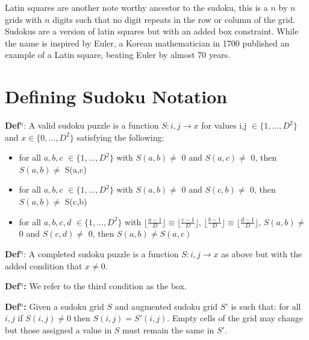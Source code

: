 \documentclass[a4paper,11pt]{report}
\newcounter{row}
\newcounter{col}
\begin{document}
Latin squares are another note worthy ancestor to the sudoku, this is a $n$ by $n$ grids with $n$ digits such that no digit repeats in the row or column of the grid. Sudokus are a version of latin squares but with an added box constraint. While the name is inspired by Euler, a  Korean mathematician in 1700 published an example of a Latin square, beating Euler by almost 70 years. 
	
\section{Defining Sudoku Notation}
	
\textbf{Def$^n$}: A valid sudoku puzzle is a function $ S: i,j \rightarrow x$ for values i,j $\in \{1,...,D^2\}$ and $x \in\{0,...,D^2\}$ satisfying the following:
\begin{itemize}
	\item{for all $a,b,c$  $\in \{1,...,D^2\}$ with $S(a,b)\neq$ 0 and $S(a,c)\neq$ 0, then $ S(a,b)\neq$ S(a,c) }
	\item{for all $a,b,c$  $\in \{1,...,D^2\}$ with $S(a,b)\neq$ 0 and $S(c,b)\neq$ 0, then $S(a,b)\neq$ S(c,b) }
	\item{for all $ a,b,c,d $ $\in \{1,...,D^2\}$ with $\lfloor\frac{a-1}{D}\rfloor\equiv\lfloor\frac{c-1}{D}\rfloor$, $\lfloor\frac{b-1}{D}\rfloor\equiv\lfloor\frac{d-1}{D}\rfloor$, $S(a,b)\neq$ 0 and $S(c,d) \neq$ 0, then $S(a,b)\neq S(a,c)$ }
\end{itemize}

\textbf{Def$^n$}: A completed sudoku puzzle is a function $ S: i,j \rightarrow x$ as above but with the added condition that $x \neq 0$.

\textbf{Def$^n$:} We refer to the third condition as the box.

\textbf{Def$^n$:} Given a sudoku grid $S$ and augmented sudoku grid $S'$ is such that: for all $i,j$ if $S(i,j)\neq0$ then $S(i,j)=S'(i,j)$. Empty cells of the grid may change but those assigned a value in $S$ must remain the same in $S'$. 


\end{document}
